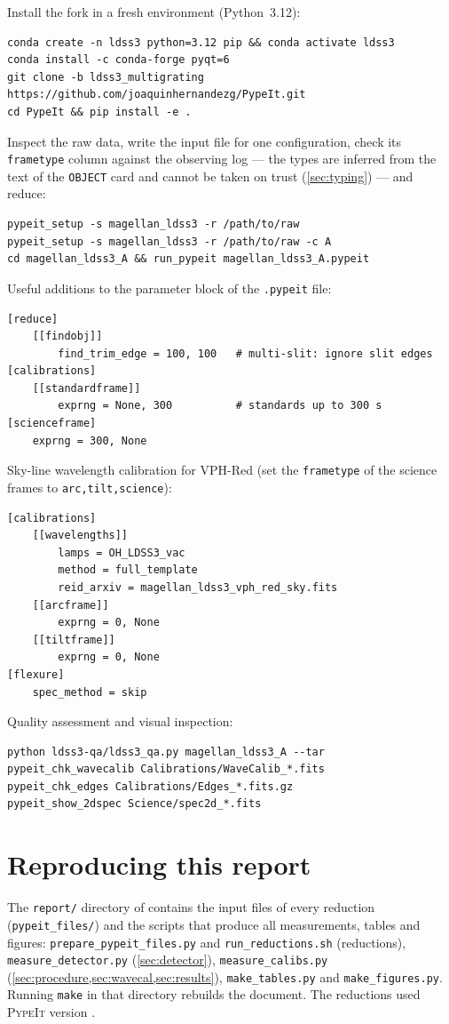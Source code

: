 \documentclass[11pt,a4paper]{article}
\newcommand{\pypeit}{\textsc{PypeIt}}
\newcommand{\code}[1]{\texttt{#1}}
\begin{document}
Install the fork in a fresh environment (Python~3.12):
\begin{lstlisting}
conda create -n ldss3 python=3.12 pip && conda activate ldss3
conda install -c conda-forge pyqt=6
git clone -b ldss3_multigrating https://github.com/joaquinhernandezg/PypeIt.git
cd PypeIt && pip install -e .
\end{lstlisting}
Inspect the raw data, write the input file for one configuration, check its
\code{frametype} column against the observing log --- the types are inferred
from the text of the \code{OBJECT} card and cannot be taken on trust
(\cref{sec:typing}) --- and reduce:
\begin{lstlisting}
pypeit_setup -s magellan_ldss3 -r /path/to/raw
pypeit_setup -s magellan_ldss3 -r /path/to/raw -c A
cd magellan_ldss3_A && run_pypeit magellan_ldss3_A.pypeit
\end{lstlisting}
Useful additions to the parameter block of the \code{.pypeit} file:
\begin{lstlisting}
[reduce]
    [[findobj]]
        find_trim_edge = 100, 100   # multi-slit: ignore slit edges
[calibrations]
    [[standardframe]]
        exprng = None, 300          # standards up to 300 s
[scienceframe]
    exprng = 300, None
\end{lstlisting}
Sky-line wavelength calibration for VPH-Red (set the \code{frametype} of the
science frames to \code{arc,tilt,science}):
\begin{lstlisting}
[calibrations]
    [[wavelengths]]
        lamps = OH_LDSS3_vac
        method = full_template
        reid_arxiv = magellan_ldss3_vph_red_sky.fits
    [[arcframe]]
        exprng = 0, None
    [[tiltframe]]
        exprng = 0, None
[flexure]
    spec_method = skip
\end{lstlisting}
Quality assessment and visual inspection:
\begin{lstlisting}
python ldss3-qa/ldss3_qa.py magellan_ldss3_A --tar
pypeit_chk_wavecalib Calibrations/WaveCalib_*.fits
pypeit_chk_edges Calibrations/Edges_*.fits.gz
pypeit_show_2dspec Science/spec2d_*.fits
\end{lstlisting}

\section{Reproducing this report}
\label{app:repro}

The \code{report/} directory of \citet{ldss3_qa} contains the input files of
every reduction (\code{pypeit\_files/}) and the scripts that produce all
measurements, tables and figures:
\code{prepare\_pypeit\_files.py} and \code{run\_reductions.sh} (reductions),
\code{measure\_detector.py} (\cref{sec:detector}),
\code{measure\_calibs.py} (\cref{sec:procedure,sec:wavecal,sec:results}),
\code{make\_tables.py} and \code{make\_figures.py}. Running \code{make} in that
directory rebuilds the document. The reductions used \pypeit{} version
\code{\pypeitVersion}.



\end{document}
